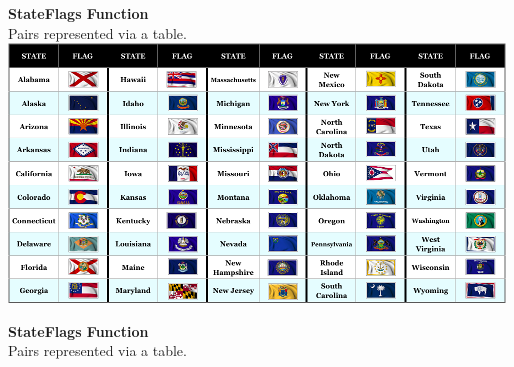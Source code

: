 \documentclass{ximera}
\begin{document}
\begin{center}
\textbf{StateFlags Function} \\
Pairs represented via a table. \\

\includegraphics{pics/allStateFlags_sm.png}
\end{center}







\begin{center}
\textbf{StateFlags Function} \\
Pairs represented via a table.
\end{center}
\end{document}
